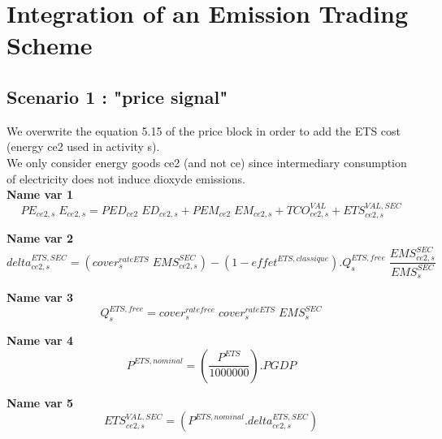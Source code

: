 \documentclass[12pt]{article}
\numberwithin{equation}{section}
\begin{document}
\section{Integration of an Emission Trading Scheme}





\subsection{Scenario 1 : "price signal"}


We overwrite the equation 5.15 of the price block in order to add the ETS cost (energy ce2 used in activity s). \\
We only consider energy goods ce2 (and not ce) since intermediary consumption of electricity does not induce dioxyde emissions. \\

\noindent\textbf{Name var 1} \\
\begin{dmath}
PE_{ce2, s} \; E_{ce2, s} = PED_{ce2} \; ED_{ce2, s} + PEM_{ce2} \; EM_{ce2, s} + TCO^{VAL}_{ce2, s} + ETS^{VAL,SEC}_{ce2, s}
\end{dmath}





\noindent\textbf{Name var 2} \\
\begin{dmath}
delta^{ETS,SEC}_{ce2, s} = \left( cover^{rateETS}_{s} \; EMS^{SEC}_{ce2, s} \right) - \left( 1 - effet^{ETS,classique} \right) . Q^{ETS,free}_{s} \; \frac{EMS^{SEC}_{ce2, s}}{EMS^{SEC}_{s}}
\end{dmath}


\noindent\textbf{Name var 3} \\
\begin{dmath}
Q^{ETS,free}_{s} = cover^{ratefree}_{s} \; cover^{rateETS}_{s} \; EMS^{SEC}_{s}
\end{dmath}


\noindent\textbf{Name var 4} \\
\begin{dmath}
P^{ETS,nominal} = \left( \frac{P^{ETS}}{1000000} \right) . PGDP
\end{dmath}


\noindent\textbf{Name var 5} \\
\begin{dmath}
ETS^{VAL,SEC}_{ce2, s} = \left( P^{ETS,nominal} . delta^{ETS,SEC}_{ce2, s} \right)
\end{dmath}
\end{document}
